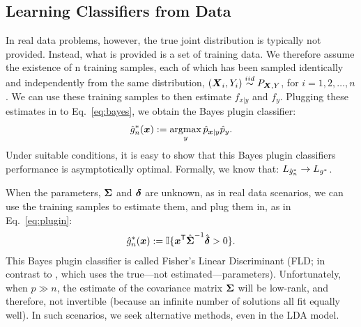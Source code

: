\documentclass[10pt]{article}
\begin{document}


\subsection{Learning Classifiers from Data}

In real data problems, however, the true joint distribution is typically not provided. Instead, what is provided is a set of training data.  We therefore assume the existence of n training samples, each of which has been sampled identically and independently from the same distribution, $(\boldsymbol{X}_i,Y_i) \overset{iid}{\sim} P_{\boldsymbol{X},Y}$, for $i =1,2,\ldots, n$.  We can use these training samples to then estimate $f_{x|y}$ and $f_y$.  Plugging these estimates in to Eq.~\eqref{eq:bayes}, we obtain the Bayes plugin classifier:
\begin{align} \label{eq:plugin}
\mh{g}^*_n(\bx) := \argmax_y \mh{p}_{\bx|y}\mh{p}_y.
\end{align}
Under suitable conditions, it is easy to show that this Bayes plugin classifiers performance is asymptotically optimal.  
Formally, we know that:
$L_{\hat{g}^*_n} \rightarrow L_{g^*}$.


When the parameters, $\boldsymbol{\Sigma}$ and $\boldsymbol{\delta}$ are unknown, as in real data scenarios, we can use the training samples to estimate them, and plug them in, as in Eq.~\eqref{eq:plugin}:
\begin{align}
\hat{g}^*_n(\boldsymbol{x}) := \mathbb{I}\{ \boldsymbol{x}^{\mathsf{T}} \hat{\boldsymbol{\Sigma}}^{-1} \hat{\boldsymbol{\delta}} > 0 \}.
\end{align}
This Bayes plugin classifier is called Fisher's Linear Discriminant (FLD; in contrast to \Lda, which uses the true---not estimated---parameters).  
Unfortunately, when $p \gg n$, the estimate of the covariance matrix $\boldsymbol{\Sigma}$ will be low-rank, and therefore, not invertible (because an infinite number of solutions all fit equally well).  In such scenarios, we seek alternative methods, even in the LDA model.



\clearpage


\end{document}
